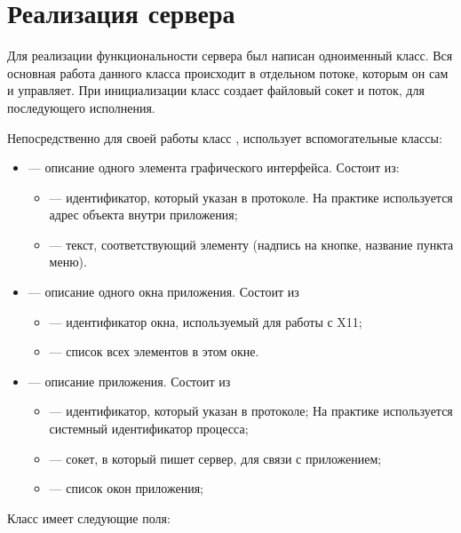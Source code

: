 \section{Реализация сервера}

Для реализации функциональности сервера был написан одноименный класс. Вся
основная работа данного класса происходит в отдельном потоке, которым он сам и
управляет. При инициализации класс создает файловый сокет и поток, для
последующего исполнения.

Непосредственно для своей работы класс , использует вспомогательные
классы:
\begin{itemize}
    \item {} — описание одного элемента графического интерфейса.
        Состоит из:
        \begin{itemize}
            \item {} — идентификатор, который указан в протоколе. На
                практике используется адрес объекта внутри приложения;
            \item {} — текст, соответствующий элементу (надпись на
                кнопке, название пункта меню).
        \end{itemize}

    \item {} — описание одного окна приложения. Состоит из
        \begin{itemize}
        \item {} — идентификатор окна, используемый для работы с X11;
        \item {} — список всех элементов в этом окне.
        \end{itemize}

    \item {} — описание приложения. Состоит из
        \begin{itemize}
        \item {} — идентификатор, который указан в протоколе; На
            практике используется системный идентификатор процесса;
        \item {} — сокет, в который пишет сервер, для связи с
            приложением;
        \item {} — список окон приложения;
        \end{itemize}
\end{itemize}

Класс  имеет следующие поля:

